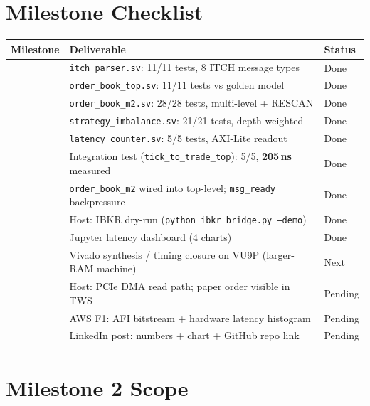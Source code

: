 \documentclass[11pt,a4paper]{article}
\newcommand{\cmark}{\textcolor{fixgreen}{\ding{51}}}
\newcommand{\pmark}{\textcolor{gray}{\ding{109}}}
\begin{document}
\section{Milestone Checklist}

\begin{center}
\small
\begin{tabular}{l p{5cm} l}
\toprule
\textbf{Milestone} & \textbf{Deliverable} & \textbf{Status} \\
\midrule
\cmark & \texttt{itch\_parser.sv}: 11/11 tests, 8 ITCH message types & Done \\
\cmark & \texttt{order\_book\_top.sv}: 11/11 tests vs golden model & Done \\
\cmark & \texttt{order\_book\_m2.sv}: 28/28 tests, multi-level + RESCAN & Done \\
\cmark & \texttt{strategy\_imbalance.sv}: 21/21 tests, depth-weighted & Done \\
\cmark & \texttt{latency\_counter.sv}: 5/5 tests, AXI-Lite readout & Done \\
\cmark & Integration test (\texttt{tick\_to\_trade\_top}): 5/5, \textbf{205\,ns} measured & Done \\
\cmark & \texttt{order\_book\_m2} wired into top-level; \texttt{msg\_ready} backpressure & Done \\
\cmark & Host: IBKR dry-run (\texttt{python ibkr\_bridge.py --demo}) & Done \\
\cmark & Jupyter latency dashboard (4 charts) & Done \\
\pmark & Vivado synthesis / timing closure on VU9P (larger-RAM machine) & Next \\
\pmark & Host: PCIe DMA read path; paper order visible in TWS & Pending \\
\pmark & AWS F1: AFI bitstream + hardware latency histogram & Pending \\
\pmark & LinkedIn post: numbers + chart + GitHub repo link & Pending \\
\bottomrule
\end{tabular}
\end{center}

\section{Milestone 2 Scope}
\end{document}
